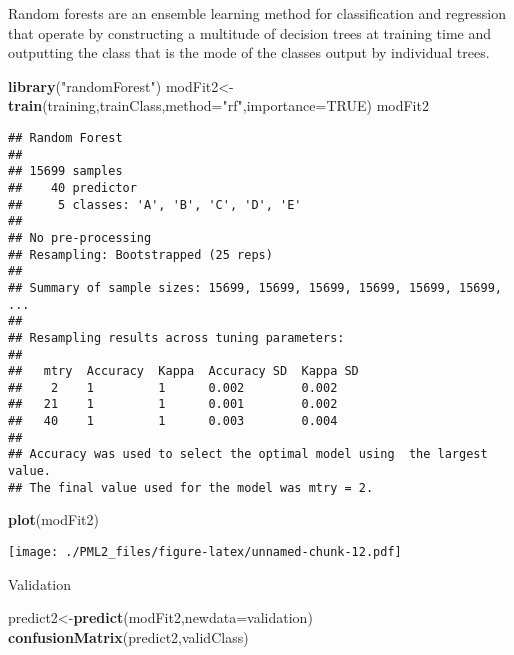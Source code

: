 \documentclass[]{article}
\newenvironment{Shaded}{\begin{snugshade}}{\end{snugshade}}
\newcommand{\KeywordTok}[1]{\textcolor[rgb]{0.13,0.29,0.53}{\textbf{{#1}}}}
\newcommand{\DataTypeTok}[1]{\textcolor[rgb]{0.13,0.29,0.53}{{#1}}}
\newcommand{\StringTok}[1]{\textcolor[rgb]{0.31,0.60,0.02}{{#1}}}
\newcommand{\OtherTok}[1]{\textcolor[rgb]{0.56,0.35,0.01}{{#1}}}
\newcommand{\NormalTok}[1]{{#1}}
\begin{document}
Random forests are an ensemble learning method for classification and
regression that operate by constructing a multitude of decision trees at
training time and outputting the class that is the mode of the classes
output by individual trees.

\begin{Shaded}
\begin{Highlighting}[]
\KeywordTok{library}\NormalTok{(}\StringTok{"randomForest"}\NormalTok{)}
\NormalTok{modFit2<-}\KeywordTok{train}\NormalTok{(training,trainClass,}\DataTypeTok{method=}\StringTok{"rf"}\NormalTok{,}\DataTypeTok{importance=}\OtherTok{TRUE}\NormalTok{)}
\NormalTok{modFit2}
\end{Highlighting}
\end{Shaded}

\begin{verbatim}
## Random Forest 
## 
## 15699 samples
##    40 predictor
##     5 classes: 'A', 'B', 'C', 'D', 'E' 
## 
## No pre-processing
## Resampling: Bootstrapped (25 reps) 
## 
## Summary of sample sizes: 15699, 15699, 15699, 15699, 15699, 15699, ... 
## 
## Resampling results across tuning parameters:
## 
##   mtry  Accuracy  Kappa  Accuracy SD  Kappa SD
##    2    1         1      0.002        0.002   
##   21    1         1      0.001        0.002   
##   40    1         1      0.003        0.004   
## 
## Accuracy was used to select the optimal model using  the largest value.
## The final value used for the model was mtry = 2.
\end{verbatim}

\begin{Shaded}
\begin{Highlighting}[]
\KeywordTok{plot}\NormalTok{(modFit2)}
\end{Highlighting}
\end{Shaded}

\texttt{[image: ./PML2\_files/figure-latex/unnamed-chunk-12.pdf]}

Validation

\begin{Shaded}
\begin{Highlighting}[]
\NormalTok{predict2<-}\KeywordTok{predict}\NormalTok{(modFit2,}\DataTypeTok{newdata=}\NormalTok{validation)}
\KeywordTok{confusionMatrix}\NormalTok{(predict2,validClass)}
\end{Highlighting}
\end{Shaded}
\end{document}
